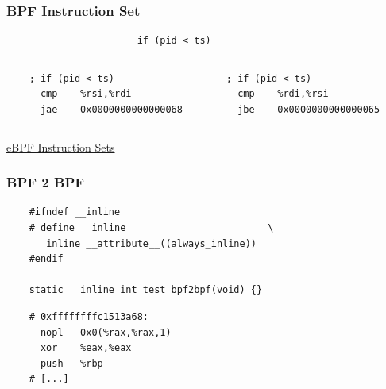 \documentclass[usenames,dvipsnames, 18pt, compress, aspectratio=169]{beamer}
\begin{document}
\fontsize{17pt}{18}\selectfont

\begin{frame}[fragile]{}
    \frametitle{BPF Instruction Set}

    \begin{center}
        \begin{verbatim}
                       if (pid < ts)
        \end{verbatim}

        \vspace{0.5cm}

        \begin{columns}
            \begin{column}{0.5\textwidth}
                \begin{verbatim}
    ; if (pid < ts)
      cmp    %rsi,%rdi
      jae    0x0000000000000068
               \end{verbatim}

           \end{column}

           \begin{column}{0.5\textwidth}
                \begin{verbatim}
; if (pid < ts)
  cmp    %rdi,%rsi
  jbe    0x0000000000000065
                \end{verbatim}

            \end{column}
        \end{columns}

    \vspace{2.0cm}
    \href{https://pchaigno.github.io/bpf/2021/10/20/ebpf-instruction-sets.html}
         {\color{links}\fontsize{10pt}{0}\selectfont eBPF Instruction Sets}
    \end{center}
\end{frame}

\begin{frame}[fragile]{}
    \frametitle{BPF 2 BPF}

    \begin{center}
        \begin{verbatim}
    #ifndef __inline
    # define __inline                         \
       inline __attribute__((always_inline))
    #endif
    
    static __inline int test_bpf2bpf(void) {}
        \end{verbatim}

        \vspace{0.5cm}

        \begin{verbatim}
    # 0xffffffffc1513a68:
      nopl   0x0(%rax,%rax,1)
      xor    %eax,%eax
      push   %rbp
    # [...]
        \end{verbatim}
    \end{center}
\end{frame}
\end{document}
